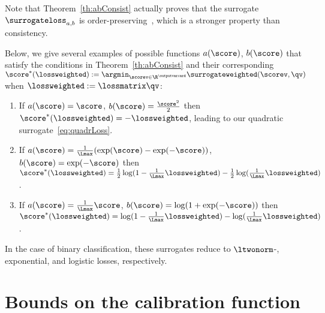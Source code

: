 \documentclass{article}
\begin{document}
Note that Theorem~\ref{th:abConsist} actually proves that the surrogate~$\surrogateloss_{a,b}$ is order-preserving~\citep{zhang04}, which is a stronger property than consistency.


Below, we give several examples of possible functions $a(\score)$, $b(\score)$ that satisfy the conditions in Theorem~\ref{th:abConsist} and their corresponding~$\score^*(\lossweighted):=\argmin_{\scorev \in \R^\outputvarcard}  \surrogateweighted(\scorev, \qv)$ when $\lossweighted := \lossmatrix \qv$:
\begin{enumerate} %
    \item If $a(\score) = \score$, $b(\score) = \frac{\score^2}{2}$ then~$\score^*(\lossweighted) = -\lossweighted$, leading to our quadratic surrogate~\eqref{eq:quadrLoss}.
    \item If $a(\score) = \frac{1}{\Lmax}(\exp(\score) - \exp(-\score))$, $b(\score) = \exp(-\score)$ then~$\score^*(\lossweighted) = \frac12\log(1-\frac{1}{\Lmax}\lossweighted) - \frac12\log(\frac{1}{\Lmax}\lossweighted)$.
    \item If $a(\score) = \frac{1}{\Lmax}\score$, $b(\score) = \log(1 + \exp(-\score))$ then~$\score^*(\lossweighted) = \log(1-\frac{1}{\Lmax}\lossweighted) - \log(\frac{1}{\Lmax}\lossweighted)$.
\end{enumerate}

In the case of binary classification, these surrogates reduce to $\ltwonorm$-, exponential, and logistic losses, respectively.

%
%
%
%
%
%
%
%
%
%
%
%
%
%
%
%
%
%
%

%
%
%
%
%

%
%
%
%
%
%
%
%
%
%
%
%
%


\section{Bounds on the calibration function}
\label{sec:boundscalibrationFunction}
\end{document}
